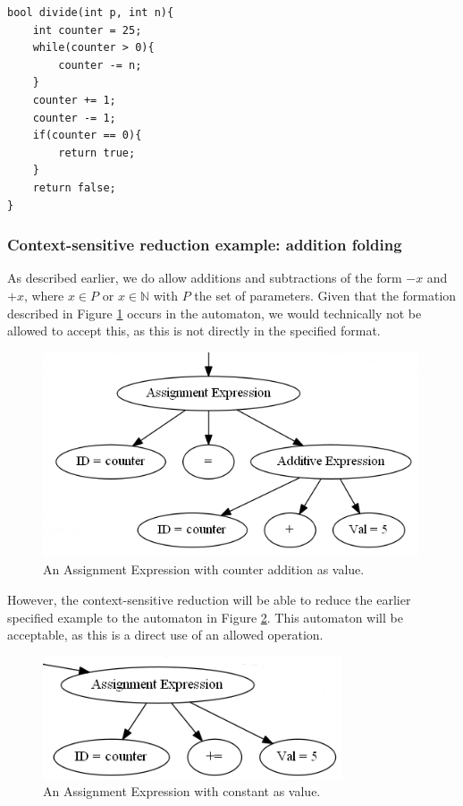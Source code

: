 \documentclass[12pt]{article}
\begin{document}
\begin{lstlisting}[style=CStyle]
bool divide(int p, int n){
	int counter = 25;
	while(counter > 0){
		counter -= n;
	}
	counter += 1;
	counter -= 1;
	if(counter == 0){
		return true;
	}
	return false;
}
\end{lstlisting}

\subsubsection{Context-sensitive reduction example: addition folding}
As described earlier, we do allow additions and subtractions of the form $-x$ and $+x$, where $x \in P$ or $x \in \mathbb{N}$ with $P$ the set of parameters. Given that the formation described in Figure \ref{fig:unfolded_addition} occurs in the automaton, we would technically not be allowed to accept this, as this is not directly in the specified format.

\begin{figure}[h]
	\centering
	\includegraphics[width=0.8\linewidth]{unfolded_addition}
	\caption{An Assignment Expression with counter addition as value.}
	\label{fig:unfolded_addition}
\end{figure}

However, the context-sensitive reduction will be able to reduce the earlier specified example to the automaton in Figure \ref{fig:folded_addition}. This automaton will be acceptable, as this is a direct use of an allowed operation.

\begin{figure}[h]
	\centering
	\includegraphics[width=0.6\linewidth]{folded_addition}
	\caption{An Assignment Expression with constant as value.}
	\label{fig:folded_addition}
\end{figure}
\newpage
\end{document}
